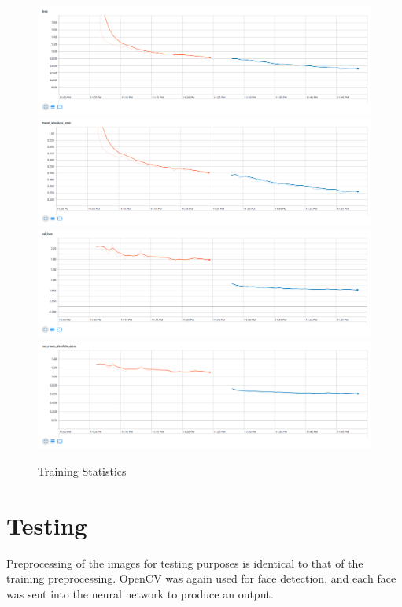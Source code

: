\documentclass{article}
\begin{document}
\begin{figure}[H]
    \centering
    \includegraphics[width=.9\linewidth]{wall-train-loss.png}
    \includegraphics[width=.9\linewidth]{wall-train-mean-abs-error.png}
    \includegraphics[width=.9\linewidth]{wall-validation-loss.png}
    \includegraphics[width=.9\linewidth]{wall-validation-mean-abs-error.png}
    \caption{Training Statistics}
    \label{tensorboard-wall}
\end{figure}

\section{Testing}

Preprocessing of the images for testing purposes is identical to that of the training preprocessing.  OpenCV was again used for face detection, and each face was sent into the neural network to produce an output.
\end{document}
